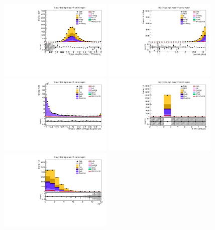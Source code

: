 \begin{figure}[tbp]
  \begin{center}
    \includegraphics[width=0.48\textwidth]{figures/wlnhbb2016/resolved/WenWHHeavyFlavorCRHighMass_pTBalanceDijetW.pdf}
    \includegraphics[width=0.48\textwidth]{figures/wlnhbb2016/resolved/WenWHHeavyFlavorCRHighMass_deltaPhiVH.pdf}
    \includegraphics[width=0.48\textwidth]{figures/wlnhbb2016/resolved/WenWHHeavyFlavorCRHighMass_bDiscrMax.pdf}
    \includegraphics[width=0.48\textwidth]{figures/wlnhbb2016/resolved/WenWHHeavyFlavorCRHighMass_nJet.pdf}
    \includegraphics[width=0.48\textwidth]{figures/wlnhbb2016/resolved/WenWHHeavyFlavorCRHighMass_nSoft5.pdf}

\end{center}
\end{figure}
